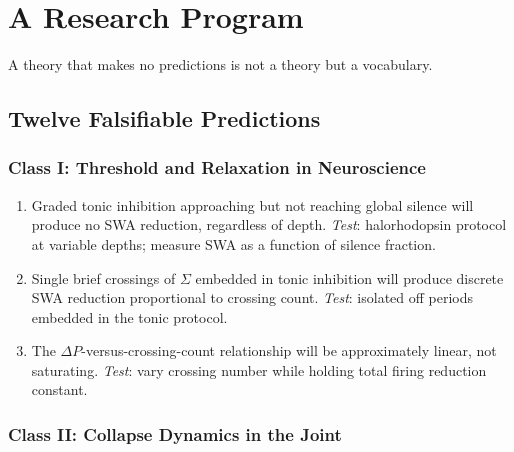 \documentclass[12pt, a4paper, twoside]{book}
\theoremstyle{definition}
\theoremstyle{remark}
\newcommand{\slp}{P}
\begin{document}


\chapter{A Research Program}
\label{ch:program}

\epigraph{A theory that makes no predictions is not a theory but a vocabulary.}{}

\section{Twelve Falsifiable Predictions}

\subsection{Class I: Threshold and Relaxation in Neuroscience}

\begin{enumerate}[label=\textbf{P\arabic*.}]
  \item Graded tonic inhibition approaching but not reaching global silence will produce no SWA reduction, regardless of depth. \textit{Test}: halorhodopsin protocol at variable depths; measure SWA as a function of silence fraction.

  \item Single brief crossings of $\Sigma$ embedded in tonic inhibition will produce discrete SWA reduction proportional to crossing count. \textit{Test}: isolated off periods embedded in the tonic protocol.

  \item The $\Delta\slp$-versus-crossing-count relationship will be approximately linear, not saturating. \textit{Test}: vary crossing number while holding total firing reduction constant.
\end{enumerate}

\subsection{Class II: Collapse Dynamics in the Joint}
\end{document}
